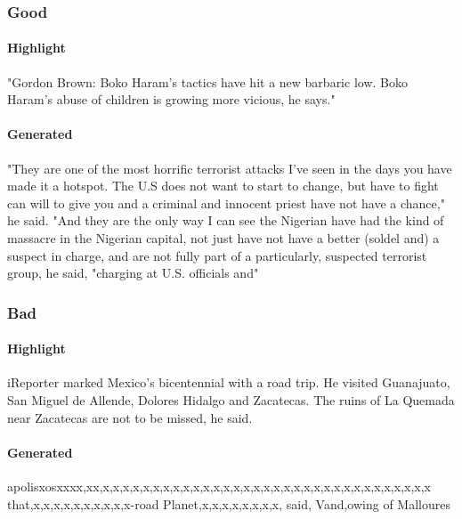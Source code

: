 \documentclass{article}
\begin{document}
\subsubsection{Good}

\paragraph{Highlight}
"Gordon Brown: Boko Haram's tactics have hit a new barbaric low. Boko Haram's abuse of children is growing more vicious, he says."

\paragraph{Generated}
"They are one of the most horrific terrorist attacks I've seen in the days you have made it a hotspot. The U.S does not want to start to change, but have to fight can will to give you and a criminal and innocent priest have not have a chance," he said. "And they are the only way I can see the Nigerian have had the kind of massacre in the Nigerian capital, not just have not have a better (soldel and) a suspect in charge, and are not fully part of a particularly, suspected terrorist group, he said, "charging at U.S. officials and"

\subsubsection{Bad}

\paragraph{Highlight}
iReporter marked Mexico's bicentennial with a road trip. He visited Guanajuato, San Miguel de Allende, Dolores Hidalgo and Zacatecas. The ruins of La Quemada near Zacatecas are not to be missed, he said.

\paragraph{Generated} 
apolisxosxxxx,xx,x,x,x,x,x,x,x,x,x,x,x,x,x,x,x,x,x,x,x,x,x,x,x,x,x,x,x,x,x,x,x,x,x that,x,x,x,x,x,x,x,x,x,x-road Planet,x,x,x,x,x,x,x,x, said, Vand,owing of Malloures
\end{document}
